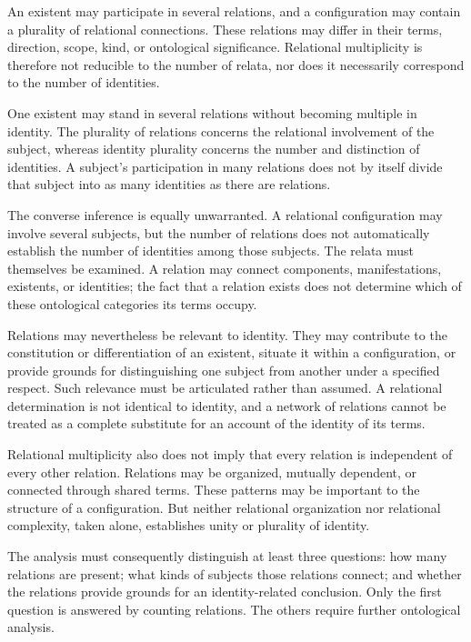 An existent may participate in several relations, and a
configuration may contain a plurality of relational connections.
These relations may differ in their terms, direction, scope,
kind, or ontological significance. Relational multiplicity
is therefore not reducible to the number of relata, nor does
it necessarily correspond to the number of identities.

One existent may stand in several relations without becoming
multiple in identity. The plurality of relations concerns
the relational involvement of the subject, whereas identity
plurality concerns the number and distinction of identities.
A subject's participation in many relations does not by itself
divide that subject into as many identities as there are
relations.

The converse inference is equally unwarranted. A relational
configuration may involve several subjects, but the number
of relations does not automatically establish the number of
identities among those subjects. The relata must themselves
be examined. A relation may connect components, manifestations,
existents, or identities; the fact that a relation exists
does not determine which of these ontological categories
its terms occupy.

Relations may nevertheless be relevant to identity. They may
contribute to the constitution or differentiation of an
existent, situate it within a configuration, or provide
grounds for distinguishing one subject from another under
a specified respect. Such relevance must be articulated
rather than assumed. A relational determination is not
identical to identity, and a network of relations cannot
be treated as a complete substitute for an account of the
identity of its terms.

Relational multiplicity also does not imply that every
relation is independent of every other relation. Relations
may be organized, mutually dependent, or connected through
shared terms. These patterns may be important to the
structure of a configuration. But neither relational
organization nor relational complexity, taken alone,
establishes unity or plurality of identity.

The analysis must consequently distinguish at least three
questions: how many relations are present; what kinds of
subjects those relations connect; and whether the relations
provide grounds for an identity-related conclusion. Only
the first question is answered by counting relations.
The others require further ontological analysis.


